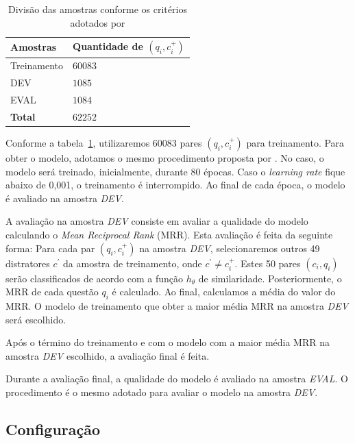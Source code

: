 \documentclass[12pt]{article}
\begin{document}
\begin{table}[h]
\centering
\begin{tabular}{ |p{3cm}|p{3cm}|  }
 \hline
 \textbf{Amostras} & \textbf{Quantidade de $(q_{i}, c_{i}^{+})$}\\
 \hline
 Treinamento & $60083$\\
 \hline
 DEV & $1085$ \\
 \hline
 EVAL & $1084$\\
 \hline
 \textbf{Total} & $62252$\\
 \hline
\end{tabular}
\caption{Divisão das amostras conforme os critérios adotados por \cite{iyer-etal-2016-summarizing}}
\label{table:divisao-amostras}
\end{table}

Conforme a tabela~\ref{table:divisao-amostras}, utilizaremos 60083 pares $(q_{i}, c_{i}^{+})$ para treinamento. Para obter o modelo, adotamos o mesmo procedimento proposta por \cite{iyer-etal-2016-summarizing}. No caso, o modelo será treinado, inicialmente, durante 80 épocas. Caso o \textit{learning rate} fique abaixo de 0,001, o treinamento é interrompido. Ao final de cada época, o modelo é avaliado na amostra \emph{DEV}. 


A avaliação na amostra \emph{DEV} consiste em avaliar a qualidade do modelo calculando o \textit{Mean Reciprocal Rank} (MRR). Esta avaliação é feita da seguinte forma:
 Para cada par $(q_{i}, c_{i}^{+})$ na amostra \emph{DEV}, selecionaremos outros 49 distratores $c^{'}$ da amostra de treinamento, onde $c^{'} \neq c_{i}^{+}$. Estes 50 pares $(c_{i}, q_{i})$ serão classificados de acordo com a função $h_{\theta}$ de similaridade. Posteriormente, o MRR de cada questão $q_{i}$ é calculado. Ao final, calculamos a média do valor do MRR. O modelo de treinamento que obter a maior média MRR na amostra \emph{DEV} será escolhido. 
 
 
 
 Após o término do treinamento e com o modelo com a maior média MRR na amostra \emph{DEV} escolhido, a avaliação final é feita.

Durante a avaliação final, a qualidade do modelo é avaliado na amostra \emph{EVAL}. O procedimento é o mesmo adotado para avaliar o modelo na amostra \emph{DEV}.


\subsection{Configuração}
\end{document}
